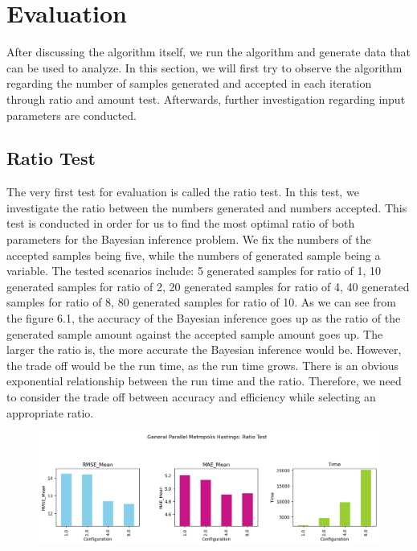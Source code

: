 \section{Evaluation}
After discussing the algorithm itself, we run the algorithm and generate data that can be used to analyze. In this section, we will first try to observe the algorithm regarding the number of samples generated and accepted in each iteration through ratio and amount test. Afterwards, further investigation regarding input parameters are conducted.

\subsection{Ratio Test}
The very first test for evaluation is called the ratio test. In this test, we investigate the ratio between the numbers generated and numbers accepted. This test is conducted in order for us to find the most optimal ratio of both parameters for the Bayesian inference problem. We fix the numbers of the accepted samples being five, while the numbers of generated sample being a variable. The tested scenarios include: 5 generated samples for ratio of 1, 10 generated samples for ratio of 2, 20 generated samples for ratio of 4, 40 generated samples for ratio of 8, 80 generated samples for ratio of 10. As we can see from the figure 6.1, the accuracy of the Bayesian inference goes up as the ratio of the generated sample amount against the accepted sample amount goes up. The larger the ratio is, the more accurate the Bayesian inference would be. However, the trade off would be the run time, as the run time grows. There is an obvious exponential relationship between the run time and the ratio. Therefore, we need to consider the trade off between accuracy and efficiency while selecting an appropriate ratio.

\begin{figure}[H]
    \centering
    \includegraphics[width=1\textwidth]{figures/gpmh/ratio_test.png}
    \captionsetup{width=.8\textwidth}
    \caption{}
    \label{fig:enter-label}
\end{figure}

